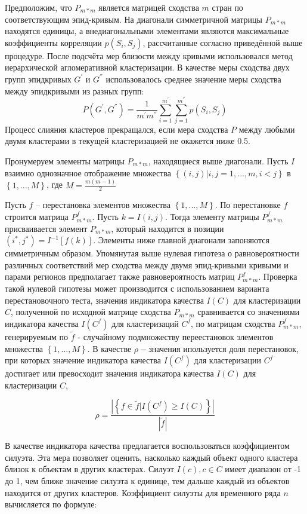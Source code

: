 \documentclass{article}
\begin{document}
Предположим, что $P_{m*m}$ является матрицей сходства $m$ стран по соответствующим эпид-кривым. На диагонали симметричной матрицы $P_{m*m}$ находятся единицы, а внедиагональными элементами являются максимальные коэффициенты корреляции $p(S_i, S_j )$, рассчитанные согласно приведённой выше процедуре. После подсчёта мер близости между кривыми использовался метод иерархической агломеративной кластеризации. В качестве меры сходства двух групп эпидкривых $G^{'}$ и $G^{''}$ использовалось среднее значение меры сходства между эпидкривыми из разных групп:
$$P(G^{'}, G^{''}) = \frac{1}{m^{'}m^{''}}\sum_{i=1}^{m^{'}}\sum_{j=1}^{m^{''}}p(S_i, S_j) $$
Процесс слияния кластеров прекращался, если мера сходства $P$ между любыми двумя кластерами в текущей кластеризацией не окажется ниже 0.5.

Пронумеруем элементы матрицы $P_{m*m}$, находящиеся выше диагонали. Пусть $I$ взаимно однозначное отображение множества $\left\{{(i, j)| i, j = 1, . . . , m, i < j}\right\}$ в $\left\{1, . . . , M\right\}$, где $M = \frac{m(m-1)}{2}$

Пусть $f$ – перестановка элементов множества $\left\{{1, . . . , M} \right\}$. По перестановке $f$ строится матрица $P_{m*m}^f$. Пусть $k = I(i, j)$. Тогда элементу матрицы $P_{m*m}^f$ присваивается элемент $P_{m*m}$, который находится в позиции $(i^*, j^*) = I^
{−1}[f(k)]$. Элементы ниже главной диагонали запоняются симметричным образом. Упомянутая выше нулевая гипотеза о равновероятности различных соответствий мер сходства между двумя эпид-кривыми кривыми и парами регионов предполагает также равновероятность матриц $P_{m*m}^f$. Проверка такой нулевой гипотезы может производится с использованием варианта перестановочного теста, значения индикатора качества $I(C)$ для кластеризации $C$, полученной по исходной матрице сходства $P_{m*m}$ сравнивается со значениями индикатора качества $I(C^f)$
для кластеризаций $C^f$, по матрицам сходства $P_{m*m}^f$, генерируемым по $\widetilde {f}$ - случайному подмножеству переестановок элементов множества $\left\{{1, . . . , M} \right\}$. В качестве $\rho-$значения ипользуется доля перестановок, при которых значение индикатора качества $I(C^f)$ для кластеризации $C^f$ достигает или превосходит значения индикатора качества $I(C)$ для кластеризации $C$,

$$\rho = \frac{|\left\{ f \in \widetilde {f}| I(C^f) \geq  I(C)\right\}|}{|\widetilde {f}|}$$

В качестве индикатора качества предлагается воспользоваться коэффициентом силуэта. Эта мера позволяет оценить, насколько каждый объект одного кластера близок к объектам в других кластерах. Силуэт $I(c), c\in C $ имеет диапазон от -1 до 1, чем ближе значение силуэта к единице, тем дальше каждый из объектов находится от других кластеров. Коэффициент силуэты для временного ряда $n$ вычисляется по формуле:
\end{document}
